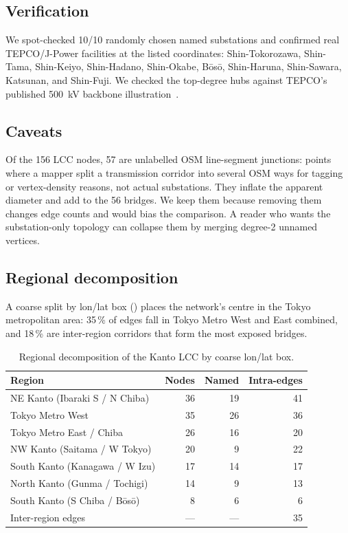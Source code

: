 \documentclass[11pt,a4paper]{article}
\begin{document}
\subsection{Verification}
We spot-checked \num{10}/\num{10} randomly chosen named substations and
confirmed real TEPCO/J-Power facilities at the listed coordinates:
Shin-Tokorozawa, Shin-Tama, Shin-Keiyo, Shin-Hadano, Shin-Okabe,
B\=os\=o, Shin-Haruna, Shin-Sawara, Katsunan, and Shin-Fuji. We checked
the top-degree hubs against TEPCO's published \SI{500}{\kilo\volt}
backbone illustration~\cite{tepco2024network}.

\subsection{Caveats}
Of the \num{156} LCC nodes, \num{57} are unlabelled OSM line-segment
junctions: points where a mapper split a transmission corridor into
several OSM ways for tagging or vertex-density reasons, not actual
substations. They inflate the apparent diameter and add to the \num{56}
bridges. We keep them because removing them changes edge counts and
would bias the comparison. A reader who wants the substation-only
topology can collapse them by merging degree-2 unnamed vertices.

\subsection{Regional decomposition}
A coarse split by lon/lat box () places the network's
centre in the Tokyo metropolitan area: \num{35}\,\% of edges fall in
Tokyo Metro West and East combined, and \num{18}\,\% are inter-region
corridors that form the most exposed bridges.

\begin{table}[h]
\centering
\small
\caption{Regional decomposition of the Kanto LCC by coarse lon/lat box.}
\label{tab:regions}
\begin{tabular}{lrrr}
\toprule
Region & Nodes & Named & Intra-edges \\
\midrule
NE Kanto (Ibaraki S / N Chiba) & 36 & 19 & 41 \\
Tokyo Metro West              & 35 & 26 & 36 \\
Tokyo Metro East / Chiba      & 26 & 16 & 20 \\
NW Kanto (Saitama / W Tokyo)  & 20 & 9 & 22 \\
South Kanto (Kanagawa / W Izu)& 17 & 14 & 17 \\
North Kanto (Gunma / Tochigi) & 14 & 9 & 13 \\
South Kanto (S Chiba / B\=os\=o)  & 8 & 6 & 6 \\
\midrule
Inter-region edges            & --- & --- & 35 \\
\bottomrule
\end{tabular}
\end{table}
\end{document}
